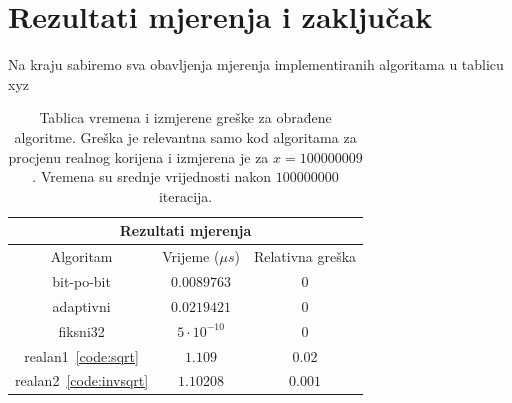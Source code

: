 \documentclass[12pt]{scrartcl}
\begin{document}
\section{Rezultati mjerenja i zaključak}
Na kraju sabiremo sva obavljenja mjerenja implementiranih algoritama u tablicu xyz
\begin{table}[t]
    \center
    \caption{Tablica vremena i izmjerene greške za obrađene algoritme. Greška je relevantna samo kod algoritama za procjenu realnog korijena i izmjerena
    je za $x=100000009$. Vremena su srednje vrijednosti nakon $100000000$ iteracija.}
    \begin{tabular}{|c|c|c|}
    \hline
    \multicolumn{3}{|c|}{\textbf{Rezultati mjerenja}}\\ \hline
    Algoritam & Vrijeme ($\mu s$) & Relativna greška \\ \hline
    bit-po-bit & $0.0089763$ & $0$ \\ \hline
    adaptivni  & $0.0219421$ & $0$ \\ \hline
    fiksni32   & $5\cdot 10^{-10}$ & $0$ \\ \hline
    realan1~\eqref{code:sqrt} & $1.109$ & $0.02$ \\ \hline
    realan2~\eqref{code:invsqrt} & $1.10208$ & $0.001$ \\ \hline
    \end{tabular}
\end{table}



\printbibliography
\end{document}
